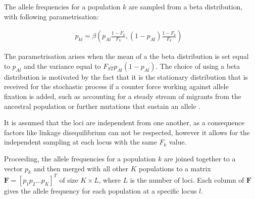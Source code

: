 \documentclass[a4paper, 11pt]{article}
\begin{document}
The allele frequencies for a population $k$ are sampled from a beta distribution, with following parametrisation:

\begin{align}
p_{kl} = \beta(p_{Al} \frac{1 - F_k}{F_k}, (1-p_{Al}) \frac{1 - F_k}{F_k})
\end{align}

The parametrisation arises when the mean of a the beta distribution is set equal to $p_{Al}$ and the variance equal to $F_{ST}p_{Al}(1-p_{Al})$.
The choice of using a beta distribution is motivated by the fact that it is the stationary distribution that is received for the stochastic process if a counter force working against allele fixation is added, such as accounting for a steady stream of migrants from the ancestral population or further mutations that sustain an allele \parencite{balding2003likelihood}.
 
It is assumed that the loci are independent from one another, as a consequence factors like linkage disequilibrium can not be respected, however it allows for the independent sampling at each locus with the same $F_k$ value.

Proceeding, the allele frequencies for a population $k$ are joined together to a vector $p_k$ and then merged with all other $K$ populations to a matrix $\mathbf{F} = [p_1 p_2 \ldots p_K]^T$ of size $K \times L$, where $L$ is the number of loci. Each column of $\mathbf{F}$ gives the allele frequency for each population at a specific locus $l$.\\

\end{document}
